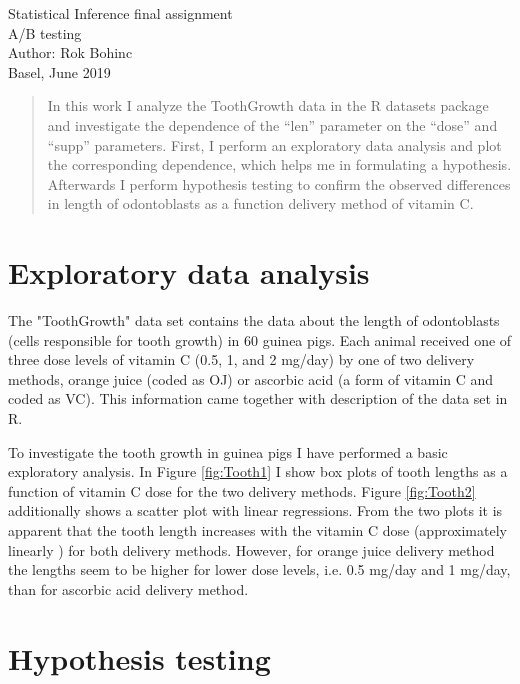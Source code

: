 \documentclass[a4paper,12pt]{article}
\begin{document}
\begin{titlepage}
\begin{center}
\large Statistical Inference final assignment\\[1cm]
\LARGE A/B testing\\[1cm]
\large Author: Rok Bohinc \\
\large Basel, June 2019 \\[1 cm]
\end{center}

\begin{abstract}
In this work I analyze the  ToothGrowth data in the R datasets package and investigate the dependence of the ``len'' parameter on the ``dose'' and ``supp'' parameters. First, I perform an exploratory data analysis and plot the corresponding dependence, which helps me in formulating a hypothesis. Afterwards I perform hypothesis testing to confirm the observed differences in length of odontoblasts as a function delivery method of vitamin C.
\end{abstract}
\end{titlepage}


\section{Exploratory data analysis}

The "ToothGrowth" data set contains the data about  the length of odontoblasts (cells responsible for tooth growth) in 60 guinea pigs. Each animal received one of three dose levels of vitamin C (0.5, 1, and 2 mg/day) by one of two delivery methods, orange juice (coded as OJ) or ascorbic acid (a form of vitamin C and coded as VC). This information came together with description of the data set in R.

To investigate the tooth growth in guinea pigs I have performed a basic exploratory analysis. In Figure \ref{fig:Tooth1} I show box plots of tooth lengths as a function of vitamin C dose for the two delivery methods. Figure \ref{fig:Tooth2} additionally shows a scatter plot with linear regressions. From the two plots it is apparent that the tooth length increases  with the vitamin C dose (approximately linearly ) for both delivery methods. However, for orange juice delivery method the lengths seem to be higher for lower dose levels, i.e. 0.5 mg/day and 1 mg/day, than for ascorbic acid delivery method. 

\section{Hypothesis testing}
\end{document}
